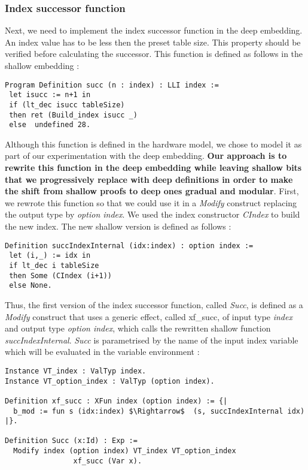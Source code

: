 \subsubsection{Index successor function}
Next, we need to implement the index successor function in the deep embedding. An index value has to be less then the preset table size. This property should be verified before calculating the successor. This function is defined as follows in the shallow embedding :
\begin{lstlisting}[caption = {Index successor function in the shallow embedding},xleftmargin=.04\textwidth,
xrightmargin=.04\textwidth,label={indexShal}]
Program Definition succ (n : index) : LLI index :=
 let isucc := n+1 in
 if (lt_dec isucc tableSize)
 then ret (Build_index isucc _)
 else  undefined 28.
\end{lstlisting} \vspace{4pt}
Although this function is defined in the hardware model, we chose to model it as part of our experimentation with the deep embedding. \textbf{Our approach is to rewrite this function in the deep embedding while leaving shallow bits that we progressively replace with deep definitions in order to make the shift from shallow proofs to deep ones gradual and modular}. First, we rewrote this function so that we could use it in a \textit{Modify} construct replacing the output type by \textit{option index}. We used the index constructor \textit{CIndex} to build the new index. The new shallow version is defined as follows : \pagebreak
\begin{lstlisting}[caption={Rewritten shallow index successor function},xleftmargin=-.01\textwidth,
xrightmargin=-.01\textwidth,label={succInt}]
Definition succIndexInternal (idx:index) : option index :=
 let (i,_) := idx in 
 if lt_dec i tableSize 
 then Some (CIndex (i+1)) 
 else None.
\end{lstlisting} \vspace{4pt}
Thus, the first version of the index successor function, called \textit{Succ}, is defined as a \textit{Modify} construct that uses a generic effect, called xf\_succ, of input type \textit{index} and output type \textit{option index}, which calls the rewritten shallow function \textit{succIndexInternal}. \textit{Succ} is parametrised by the name of the input index variable which will be evaluated in the variable environment : 
\begin{lstlisting}[caption = {Definition of Succ},xleftmargin=-.02\textwidth,
xrightmargin=-.02\textwidth, mathescape=true,label={SuccFn}]
Instance VT_index : ValTyp index.
Instance VT_option_index : ValTyp (option index).

Definition xf_succ : XFun index (option index) := {|
  b_mod := fun s (idx:index) $\Rightarrow$  (s, succIndexInternal idx)
|}.

Definition Succ (x:Id) : Exp :=
  Modify index (option index) VT_index VT_option_index 
  	            xf_succ (Var x).
\end{lstlisting} \vspace{4pt}

